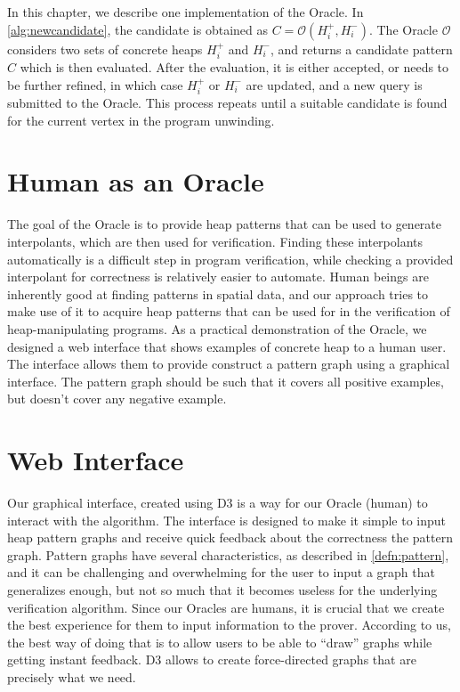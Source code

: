 \label{ch:interface-oracle}

In this chapter, we describe one implementation of the Oracle. In \autoref{alg:newcandidate}, the candidate is obtained as $C = \mathcal{O}(H_i^{+}, H_i^{-})$. The Oracle $\mathcal{O}$ considers two sets of concrete heaps $H_i^{+}$ and $H_i^{-}$, and returns a candidate pattern $C$ which is then evaluated. After the evaluation, it is either accepted, or needs to be further refined, in which case $H_i^{+}$ or $H_i^{-}$ are updated, and a new query is submitted to the Oracle. This process repeats until a suitable candidate is found for the current vertex in the program unwinding.

\section{Human as an Oracle}
The goal of the Oracle is to provide heap patterns that can be used to generate interpolants, which are then used for verification. Finding these interpolants automatically is a difficult step in program verification, while checking a provided interpolant for correctness is relatively easier to automate. Human beings are inherently good at finding patterns in spatial data, and our approach tries to make use of it to acquire heap patterns that can be used for in the verification of heap-manipulating programs. As a practical demonstration of the Oracle, we designed a web interface that shows examples of concrete heap to a human user. The interface allows them to provide construct a pattern graph using a graphical interface. The pattern graph should be such that it covers all positive examples, but doesn't cover any negative example.

\section{Web Interface}
\label{sec:web-interface}
Our graphical interface, created using D3 \cite{d3js} is a way for our Oracle (human) to interact with the \verifier algorithm. The interface is designed to make it simple to input heap pattern graphs and receive quick feedback about the correctness the pattern graph. Pattern graphs have several characteristics, as described in \autoref{defn:pattern}, and it can be challenging and overwhelming for the user to input a graph that generalizes enough, but not so much that it becomes useless for the underlying verification algorithm. Since our Oracles are humans, it is crucial that we create the best experience for them to input information to the prover. According to us, the best way of doing that is to allow users to be able to ``draw'' graphs while getting instant feedback. D3 allows to create force-directed graphs that are precisely what we need.


